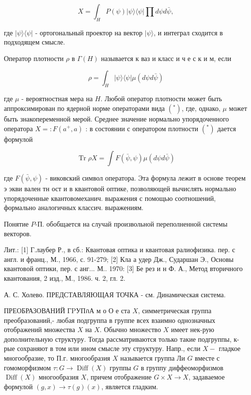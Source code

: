 \documentclass[10pt]{article}
\begin{document}
\[

X=\int_{H} P(\psi)|\psi\rangle\langle\psi| \prod d \psi d \bar{\psi},

\]



где $|\psi\rangle\langle\psi|$ - ортогональный проектор на вектор $|\psi\rangle$, и интеграл сходится в подходящем смысле.



Оператор плотности $\rho$ в $\Gamma(H)$ называется к ваз и класс и ч е с к и м, если



\[

\rho=\int_{H}|\psi\rangle\langle\psi| \mu(d \psi d \bar{\psi})

\]



где $\mu$ - вероятностная мера на $H$. Любой оператор плотности может быть аппроксимирован по ядерной норме операторами вида $\left({ }^{*}\right)$, где, однако, $\mu$ может быть знакопеременной мерой. Среднее значение нормально упорядоченного оператора $X=: F\left(a^{+}, a\right)$ : в состоянии с оператором плотности $\left(^{*}\right)$ дается формулой



\[

\operatorname{Tr} \rho X=\int F(\bar{\psi}, \psi) \mu(d \psi d \bar{\psi})

\]



где $F(\bar{\psi}, \psi)$ - виковский символ оператора. Эта формула лежит в основе теорем э экви вален тн ост и в квантовой оптике, позволяющей вычислять нормально упорядоченные квантовомеханич. выражения с помощью соотношений, формально аналогичных классич. выражениям.



Понятие $P$-П. обобщается на случай произвольной переполненной системы векторов.



Лит.: [1] Г.лаубер Р., в сб.: Квантовая оптика и квантовая ралиофизика. пер. с англ. и франц., М., 1966, с. 91-279; [2] Кла а удер Дж., Сударшан Э., Основы квантовой оптики, пер. с анг... М.. 1970: [3] Бе рез и н Ф. А., Метод вторичного квантования, 2 изд., М., 1986. ч. 2, гл. 2.



А. С. Холево. ПРЕДСТАВЛЯЮЩАЯ ТОЧКА - см. Динамическая система.



ПРЕОБРАЗОВАНИЙ ГPУПกА м о О е ста $X$, симметрическая группа преобразований,- любая подгруппа в группе всех взаимно однозначных отображений множества $X$ на $X$. Обычно множество $X$ имеет нек-рую дополнительную структуру. Тогда рассматриваются только такие подгруппы, к-рые сохраняют в том или ином смысле эту структуру. Напр., если $X-$ гладкое многообразие, то П.г. многообразия $X$ называется группа Ли $G$ вместе с гомоморфизмом $\tau: G \rightarrow \operatorname{Diff}(X)$ группы $G$ в группу диффеоморфизмов $\operatorname{Diff}(X)$ многообразия $X$, причем отображение $G \times X \rightarrow X$, задаваемое формулой $(g, x) \rightarrow \tau(g)(x)$, является гладким.
\end{document}

